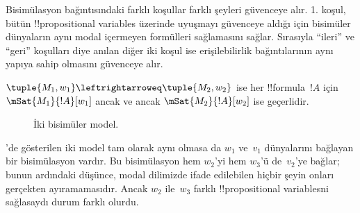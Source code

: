 \documentclass[../../../include/open-logic-section]{subfiles}
\begin{document}
Bisimülasyon bağıntısındaki farklı koşullar farklı şeyleri güvenceye alır. 1.
koşul, bütün !!{propositional variable}s üzerinde uyuşmayı güvenceye aldığı
için bisimüler dünyaların aynı modal içermeyen formülleri sağlamasını sağlar.
Sırasıyla ``ileri'' ve ``geri'' koşulları diye anılan diğer iki koşul ise
erişilebilirlik bağıntılarının aynı yapıya sahip olmasını güvenceye alır.

\begin{thm}
$\tuple{M_1, w_1} \leftrightarroweq \tuple{M_2, w_2}$ ise her
!!{formula}~$!A$ için $\mSat{M_1}{!A}[w_1]$ ancak ve ancak
$\mSat{M_2}{!A}[w_2]$ ise geçerlidir.
\end{thm}

\begin{figure}
  \begin{center}
  \end{center}
  \caption{İki bisimüler model.}
\end{figure}

'de gösterilen iki model tam olarak aynı olmasa da
$w_1$ ve~$v_1$ dünyalarını bağlayan bir bisimülasyon vardır. Bu bisimülasyon
hem $w_2$'yi hem $w_3$'ü de~$v_2$'ye bağlar; bunun ardındaki düşünce, modal
dilimizde ifade edilebilen hiçbir şeyin onları gerçekten ayıramamasıdır.
Ancak $w_2$ ile~$w_3$ farklı !!{propositional variable}s{}ni sağlasaydı durum
farklı olurdu.
\end{document}
